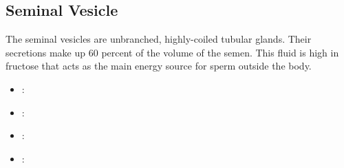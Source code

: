 \subsection{Seminal Vesicle}
The seminal vesicles are unbranched, highly-coiled tubular glands. Their secretions make up 60 percent of the volume of the semen. This fluid is high in fructose that acts as the main energy source for sperm outside the body.
\begin{center}
\end{center}
\begin{multicols}{2}
\begin{itemize}
  \item {}:
  
  \begin{center}
  \end{center}
  
  \item {}:
  
  \begin{center}
  \end{center}

  \item {}:
  
  \begin{center}
  \end{center}
  
  \item {}:
  
  \begin{center}
  \end{center}
  
\end{itemize}
\end{multicols}

